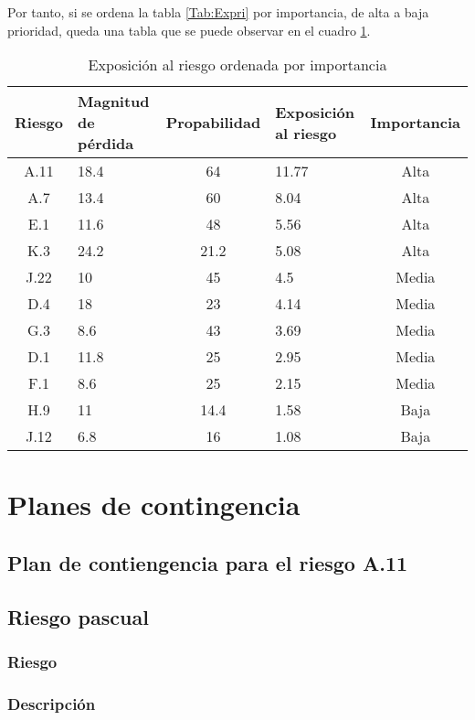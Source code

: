 \documentclass[11pt,a4paper,spanish,twoside]{report}
\begin{document}
Por tanto, si se ordena la tabla \ref{Tab:Expri} por importancia, de alta a
baja prioridad, queda una tabla que se puede observar en el cuadro
\ref{Tab:Expor}.


\begin{table}[!h]
  \centering
  \begin{tabular}{|c||p{}||c||p{}||c|}
    \hline
    \textbf{Riesgo} & \textbf{Magnitud de pérdida} & \textbf{Propabilidad} & 
    \textbf{Exposición al riesgo} & \textbf{Importancia} \\
    \hline \hline
    A.11 & 18.4 & 64 & 11.77 & Alta \\ 
    \hline
    A.7 & 13.4 & 60 & 8.04 & Alta \\
    \hline 
    E.1 & 11.6 & 48 & 5.56 & Alta \\
    \hline
    K.3 & 24.2 & 21.2 & 5.08 & Alta \\
    \hline
    J.22 & 10 & 45 & 4.5 & Media \\
    \hline
    D.4 & 18 & 23 & 4.14 & Media \\
    \hline
    G.3 & 8.6 & 43 & 3.69 & Media \\
    \hline
    D.1 & 11.8 & 25 & 2.95 & Media \\
    \hline
    F.1 & 8.6 & 25 & 2.15 & Media \\
    \hline
    H.9 & 11 & 14.4 & 1.58 & Baja \\
    \hline
    J.12 & 6.8 & 16 & 1.08 & Baja \\
    \hline
  \end{tabular}
  \caption{Exposición al riesgo ordenada por importancia} 
  \label{Tab:Expor}
\end{table}
\chapter{Planes de contingencia}
\section{Plan de contiengencia para el riesgo A.11}
\section{Riesgo pascual}
\subsection{Riesgo}
\subsection{Descripción}
\end{document}

